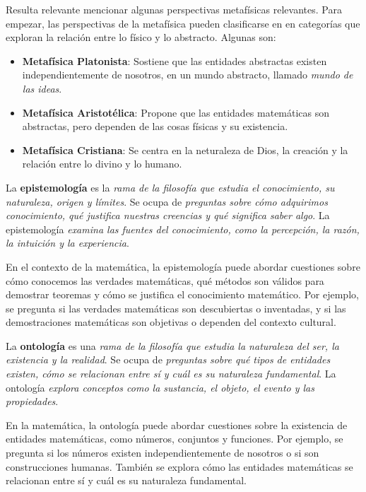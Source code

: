 \documentclass[12pt]{report}
\newcounter{it}
\theoremstyle{largebreak}
\begin{document}
    Resulta relevante mencionar algunas perspectivas metafísicas relevantes. Para empezar, las perspectivas de la metafísica pueden clasificarse en en categorías que exploran la relación entre lo físico y lo abstracto. Algunas son:
    \begin{itemize}
        \item \textbf{Metafísica Platonista}: Sostiene que las entidades abstractas existen independientemente de nosotros, en un mundo abstracto, llamado \textit{mundo de las ideas}.
        \item \textbf{Metafísica Aristotélica}: Propone que las entidades matemáticas son abstractas, pero dependen de las cosas físicas y su existencia.
        \item \textbf{Metafísica Cristiana}: Se centra en la neturaleza de Dios, la creación y la relación entre lo divino y lo humano.
    \end{itemize}

    \begin{mydef}
        La \textbf{epistemología} es la \textit{rama de la filosofía que estudia el conocimiento, su naturaleza, origen y límites}. Se ocupa de \textit{preguntas sobre cómo adquirimos conocimiento, qué justifica nuestras creencias y qué significa saber algo}. La epistemología \textit{examina las fuentes del conocimiento, como la percepción, la razón, la intuición y la experiencia}.
    \end{mydef}

    En el contexto de la matemática, la epistemología puede abordar cuestiones sobre cómo conocemos las verdades matemáticas, qué métodos son válidos para demostrar teoremas y cómo se justifica el conocimiento matemático. Por ejemplo, se pregunta si las verdades matemáticas son descubiertas o inventadas, y si las demostraciones matemáticas son objetivas o dependen del contexto cultural.

    \begin{mydef}
        La \textbf{ontología} es una \textit{rama de la filosofía que estudia la naturaleza del ser, la existencia y la realidad}. Se ocupa de \textit{preguntas sobre qué tipos de entidades existen, cómo se relacionan entre sí y cuál es su naturaleza fundamental}. La ontología \textit{explora conceptos como la sustancia, el objeto, el evento y las propiedades}.
    \end{mydef}

    En la matemática, la ontología puede abordar cuestiones sobre la existencia de entidades matemáticas, como números, conjuntos y funciones. Por ejemplo, se pregunta si los números existen independientemente de nosotros o si son construcciones humanas. También se explora cómo las entidades matemáticas se relacionan entre sí y cuál es su naturaleza fundamental.
\end{document}
